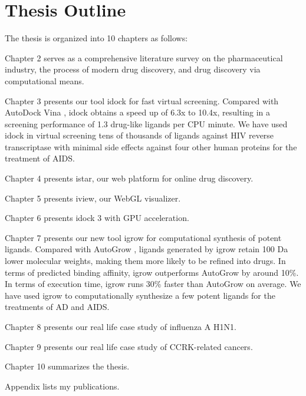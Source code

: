 \section{Thesis Outline}

The thesis is organized into 10 chapters as follows:

Chapter 2 serves as a comprehensive literature survey on the pharmaceutical industry, the process of modern drug discovery, and drug discovery via computational means.

Chapter 3 presents our tool idock for fast virtual screening. Compared with AutoDock Vina \citep{595}, idock obtains a speed up of 6.3x to 10.4x, resulting in a screening performance of 1.3 drug-like ligands per CPU minute. We have used idock in virtual screening tens of thousands of ligands against HIV reverse transcriptase with minimal side effects against four other human proteins for the treatment of AIDS.

Chapter 4 presents istar, our web platform for online drug discovery.

Chapter 5 presents iview, our WebGL visualizer.

Chapter 6 presents idock 3 with GPU acceleration.

Chapter 7 presents our new tool igrow for computational synthesis of potent ligands. Compared with AutoGrow \citep{466}, ligands generated by igrow retain 100 Da lower molecular weights, making them more likely to be refined into drugs. In terms of predicted binding affinity, igrow outperforms AutoGrow by around 10\%. In terms of execution time, igrow runs 30\% faster than AutoGrow on average. We have used igrow to computationally synthesize a few potent ligands for the treatments of AD and AIDS.

Chapter 8 presents our real life case study of influenza A H1N1.

Chapter 9 presents our real life case study of CCRK-related cancers.

Chapter 10 summarizes the thesis.

Appendix lists my publications.

\chapterend
